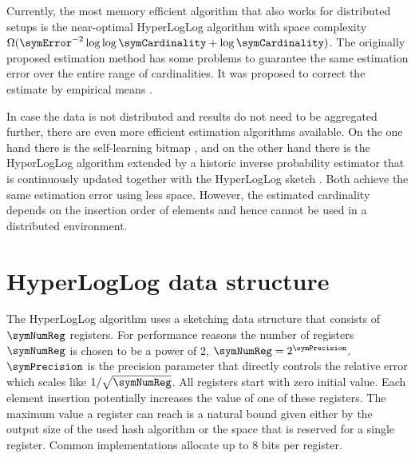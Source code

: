 \documentclass[a4paper]{scrartcl}
\begin{document}
Currently, the most memory efficient algorithm that also works for distributed setups is the near-optimal HyperLogLog algorithm \cite{Flajolet2007} with space complexity $\Omega(\symError^{-2} \log\log\symCardinality +\log \symCardinality)$. The originally proposed estimation method has some problems to guarantee the same estimation error over the entire range of cardinalities. It was proposed to correct the estimate by empirical means \cite{Heule2013,Rhodes2015,Sanfilippo2014}. 

In case the data is not distributed and results do not need to be aggregated further, there are even more efficient estimation algorithms available. On the one hand there is the self-learning bitmap \cite{Chen2011}, and on the other hand there is the HyperLogLog algorithm extended by a historic inverse probability estimator that is continuously updated together with the HyperLogLog sketch \cite{Ting2014, Cohen2014}. Both achieve the same estimation error using less space. However, the estimated cardinality depends on the insertion order of elements and hence cannot be used in a distributed environment. 


\section{HyperLogLog data structure}
The HyperLogLog algorithm uses a sketching data structure that consists of $\symNumReg$ registers. For performance reasons the number of registers $\symNumReg$ is chosen to be a power of 2, $\symNumReg = 2^\symPrecision$. $\symPrecision$ is the precision parameter that directly controls the relative error which scales like $1/\sqrt{\symNumReg}$. All registers start with zero initial value. Each element insertion potentially increases the value of one of these registers. The maximum value a register can reach is a natural bound given either by the output size of the used hash algorithm or the space that is reserved for a single register. Common implementations allocate up to 8 bits per register.
\end{document}
